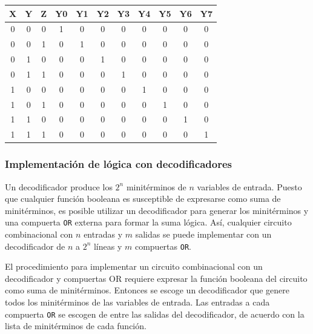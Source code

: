 \begin{table}[h]
    \centering
    \begin{tabular}{ccc|cccccccc}
        \toprule
        \textbf{X} & \textbf{Y} & \textbf{Z} & \textbf{Y0} & \textbf{Y1} & \textbf{Y2} & \textbf{Y3} & \textbf{Y4} & \textbf{Y5} & \textbf{Y6} & \textbf{Y7}\\
        \midrule
        0 & 0 & 0 & 1 & 0 & 0 & 0 & 0 & 0 & 0 & 0\\
        0 & 0 & 1 & 0 & 1 & 0 & 0 & 0 & 0 & 0 & 0\\
        0 & 1 & 0 & 0 & 0 & 1 & 0 & 0 & 0 & 0 & 0\\
        0 & 1 & 1 & 0 & 0 & 0 & 1 & 0 & 0 & 0 & 0\\
        1 & 0 & 0 & 0 & 0 & 0 & 0 & 1 & 0 & 0 & 0\\
        1 & 0 & 1 & 0 & 0 & 0 & 0 & 0 & 1 & 0 & 0\\
        1 & 1 & 0 & 0 & 0 & 0 & 0 & 0 & 0 & 1 & 0\\
        1 & 1 & 1 & 0 & 0 & 0 & 0 & 0 & 0 & 0 & 1\\
        \bottomrule
    \end{tabular}
\end{table}

\subsubsection{Implementación de lógica con decodificadores}
Un decodificador produce los $2^n$ minitérminos de $n$ variables de entrada. Puesto que cualquier función booleana es susceptible de expresarse como suma de minitérminos, es posible utilizar un decodificador para generar los minitérminos y una compuerta \texttt{OR} externa para formar la suma lógica. Así, cualquier circuito combinacional con $n$ entradas y $m$ salidas se puede implementar con un decodificador de $n$ a $2^n$ líneas y $m$ compuertas \texttt{OR}.

El procedimiento para implementar un circuito combinacional con un decodificador y compuertas OR requiere expresar la función booleana del circuito como suma de minitérminos. Entonces se escoge un decodificador que genere todos los minitérminos de las variables de entrada. Las entradas a cada compuerta \texttt{OR} se escogen de entre las salidas del decodificador, de acuerdo con la lista de minitérminos de cada función.

\newpage
